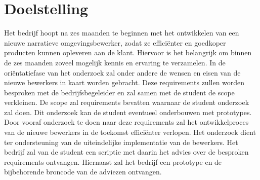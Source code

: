 \chapter{Doelstelling}
Het bedrijf hoopt na zes maanden te beginnen met het ontwikkelen van een nieuwe narratieve omgevingsbewerker, zodat ze efficiënter en goedkoper producten kunnen opleveren aan de klant. Hiervoor is het belangrijk om binnen de zes maanden zoveel mogelijk kennis en ervaring te verzamelen. 
In de oriëntatiefase van het onderzoek zal onder andere de wensen en eisen van de nieuwe bewerkers in kaart worden gebracht. Deze requirements zullen worden besproken met de bedrijfsbegeleider en zal samen met de student de scope verkleinen. De scope zal requirements bevatten waarnaar de student onderzoek zal doen. Dit onderzoek kan de student eventueel onderbouwen met prototypes.
Door vooraf onderzoek te doen naar deze requirements zal het ontwikkelproces van de nieuwe bewerkers in de toekomst efficiënter verlopen. Het onderzoek dient ter ondersteuning van de uiteindelijke implementatie van de bewerkers.
Het bedrijf zal van de student een scriptie met daarin het advies over de besproken requirements ontvangen. Hiernaast zal het bedrijf een prototype en de bijbehorende broncode van de adviezen ontvangen.
